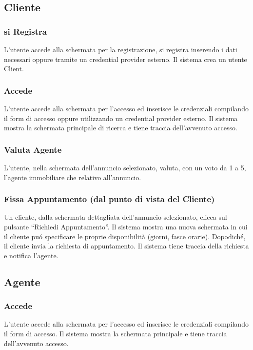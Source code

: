 \subsection{Cliente}
\subsubsection{si Registra}
L'utente accede alla schermata per la registrazione, si registra inserendo
i dati necessari oppure tramite un credential provider esterno. 
Il sistema crea un utente Client.

\subsubsection{Accede}
L'utente accede alla schermata per l'accesso ed inserisce le credenziali 
compilando il form di accesso oppure utilizzando un credential provider esterno. 
Il sistema mostra la schermata principale di ricerca e tiene traccia 
dell'avvenuto accesso.

\subsubsection{Valuta Agente}
L'utente, nella schermata dell'annuncio selezionato, valuta, con un voto da 1 
a 5, l'agente immobiliare che relativo all'annuncio.

\subsubsection{Fissa Appuntamento (dal punto di vista del Cliente)}
Un cliente, dalla schermata dettagliata dell'annuncio selezionato, clicca sul 
pulsante “Richiedi Appuntamento”. Il sistema mostra una nuova schermata in cui il 
cliente puó specificare le proprie disponibilità (giorni, fasce orarie). 
Dopodiché, il cliente invia la richiesta di appuntamento. Il sistema tiene
traccia della richiesta e notifica l'agente.

\subsection{Agente}
\subsubsection{Accede}
L'utente accede alla schermata per l'accesso ed inserisce le credenziali 
compilando il form di accesso. Il sistema mostra la schermata principale 
e tiene traccia dell'avvenuto accesso.

